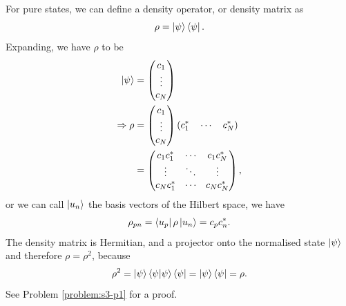 \documentclass{article}
\begin{document}
For pure states, we can define a density operator, or density matrix as
\[
    \rho =\ket{\psi }\bra{\psi }.
\]
Expanding, we have $\rho $ to be
\begin{align*}
    \ket{\psi } &=\begin{pmatrix}
        c_1 \\ \vdots \\ c_N
    \end{pmatrix} \\
        \Rightarrow \rho &=\begin{pmatrix}
            c_1 \\ \vdots \\ c_N
        \end{pmatrix}\left( c_1^*\quad \cdots\quad c_N^* \right) \\
                         &=\begin{pmatrix}
                             c_1c_1^* & \cdots & c_1c_N^* \\
                             \vdots & \ddots & \vdots \\
                             c_Nc_1^* & \cdots & c_Nc_N^*
                             \end{pmatrix},
\end{align*}
or we can call $\ket{u_n}$ the basis vectors of the Hilbert space, we have
\[
    \rho _{pn}=\bra{u_p}\rho \ket{u_n}=c_pc_n^*.
\]
The density matrix is Hermitian, and a projector onto the normalised state $\ket{\psi }$ and therefore $\rho =\rho^2$, because
\[
    \rho^2=\ket{\psi }\braket{\psi }{\psi }\bra{\psi }=\ket{\psi }\bra{\psi }=\rho .
\]
See Problem \ref{problem:s3-p1} for a proof.
\end{document}
